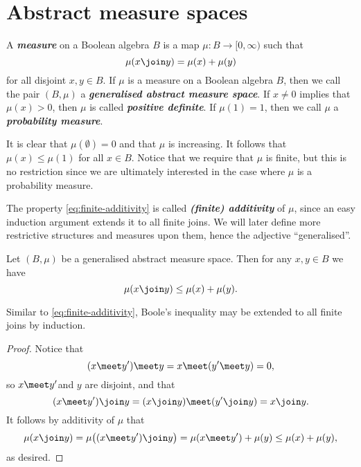 \documentclass[article, a4paper, 11pt, oneside]{memoir}
\numberwithin{equation}{chapter}
\newcommand{\keyword}[1]{{\itshape\bfseries #1}}
\begin{document}
\section{Abstract measure spaces}

\begin{definition}
    A \keyword{measure} on a Boolean algebra $B$ is a map $\mu \colon B \to [0,\infty)$ such that
    \begin{equation}
        \label{eq:finite-additivity}
        \mu(x \join y)
            = \mu(x) + \mu(y)
    \end{equation}
    for all disjoint $x,y \in B$. If $\mu$ is a measure on a Boolean algebra $B$, then we call the pair $(B,\mu)$ a \keyword{generalised abstract measure space}. If $x \neq 0$ implies that $\mu(x) > 0$, then $\mu$ is called \keyword{positive definite}. If $\mu(1) = 1$, then we call $\mu$ a \keyword{probability measure}.
\end{definition}
%
It is clear that $\mu(\emptyset) = 0$ and that $\mu$ is increasing. It follows that $\mu(x) \leq \mu(1)$ for all $x \in B$. Notice that we require that $\mu$ is finite, but this is no restriction since we are ultimately interested in the case where $\mu$ is a probability measure. %

The property \cref{eq:finite-additivity} is called \keyword{(finite) additivity} of $\mu$, since an easy induction argument extends it to all finite joins. We will later define more restrictive structures and measures upon them, hence the adjective \enquote{generalised}.

\begin{proposition}
    Let $(B,\mu)$ be a generalised abstract measure space. Then for any $x,y \in B$ we have
    \begin{equation*}
        \mu(x \join y)
            \leq \mu(x) + \mu(y).
    \end{equation*}
\end{proposition}
%
Similar to \cref{eq:finite-additivity}, Boole's inequality may be extended to all finite joins by induction.

\begin{proof}
    Notice that
    \begin{equation*}
        (x \meet y') \meet y = x \meet (y' \meet y) = 0,
    \end{equation*}
    so $x \meet y'$and $y$ are disjoint, and that
    \begin{equation*}
        (x \meet y') \join y = (x \join y) \meet (y' \join y) = x \join y.
    \end{equation*}
    It follows by additivity of $\mu$ that
    \begin{equation*}
        \mu(x \join y)
            = \mu \bigl( (x \meet y') \join y \bigr)
            = \mu(x \meet y') + \mu(y)
            \leq \mu(x) + \mu(y),
    \end{equation*}
    as desired.
\end{proof}
\end{document}
